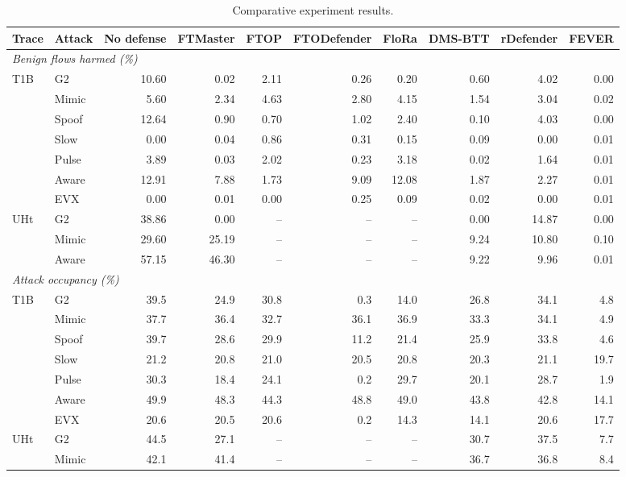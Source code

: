 \begin{table}[t]
\centering
\caption{Comparative experiment results.}
\label{tab:main}
\footnotesize
\setlength{\tabcolsep}{3pt}
\begin{tabular}{llrrrrrrrr}
\toprule
Trace & Attack & No defense & FTMaster & FTOP & FTODefender & FloRa & DMS-BTT & rDefender & FEVER \\
\midrule
\multicolumn{10}{l}{\textit{Benign flows harmed (\%)}} \\
\midrule
T1B & G2 & 10.60 & 0.02 & 2.11 & 0.26 & 0.20 & 0.60 & 4.02 & 0.00 \\
 & Mimic & 5.60 & 2.34 & 4.63 & 2.80 & 4.15 & 1.54 & 3.04 & 0.02 \\
 & Spoof & 12.64 & 0.90 & 0.70 & 1.02 & 2.40 & 0.10 & 4.03 & 0.00 \\
 & Slow & 0.00 & 0.04 & 0.86 & 0.31 & 0.15 & 0.09 & 0.00 & 0.01 \\
 & Pulse & 3.89 & 0.03 & 2.02 & 0.23 & 3.18 & 0.02 & 1.64 & 0.01 \\
 & Aware & 12.91 & 7.88 & 1.73 & 9.09 & 12.08 & 1.87 & 2.27 & 0.01 \\
 & EVX & 0.00 & 0.01 & 0.00 & 0.25 & 0.09 & 0.02 & 0.00 & 0.01 \\
UHt & G2 & 38.86 & 0.00 & -- & -- & -- & 0.00 & 14.87 & 0.00 \\
 & Mimic & 29.60 & 25.19 & -- & -- & -- & 9.24 & 10.80 & 0.10 \\
 & Aware & 57.15 & 46.30 & -- & -- & -- & 9.22 & 9.96 & 0.01 \\
\midrule
\multicolumn{10}{l}{\textit{Attack occupancy (\%)}} \\
\midrule
T1B & G2 & 39.5 & 24.9 & 30.8 & 0.3 & 14.0 & 26.8 & 34.1 & 4.8 \\
 & Mimic & 37.7 & 36.4 & 32.7 & 36.1 & 36.9 & 33.3 & 34.1 & 4.9 \\
 & Spoof & 39.7 & 28.6 & 29.9 & 11.2 & 21.4 & 25.9 & 33.8 & 4.6 \\
 & Slow & 21.2 & 20.8 & 21.0 & 20.5 & 20.8 & 20.3 & 21.1 & 19.7 \\
 & Pulse & 30.3 & 18.4 & 24.1 & 0.2 & 29.7 & 20.1 & 28.7 & 1.9 \\
 & Aware & 49.9 & 48.3 & 44.3 & 48.8 & 49.0 & 43.8 & 42.8 & 14.1 \\
 & EVX & 20.6 & 20.5 & 20.6 & 0.2 & 14.3 & 14.1 & 20.6 & 17.7 \\
UHt & G2 & 44.5 & 27.1 & -- & -- & -- & 30.7 & 37.5 & 7.7 \\
 & Mimic & 42.1 & 41.4 & -- & -- & -- & 36.7 & 36.8 & 8.4 \\

\end{tabular}
\end{table}

